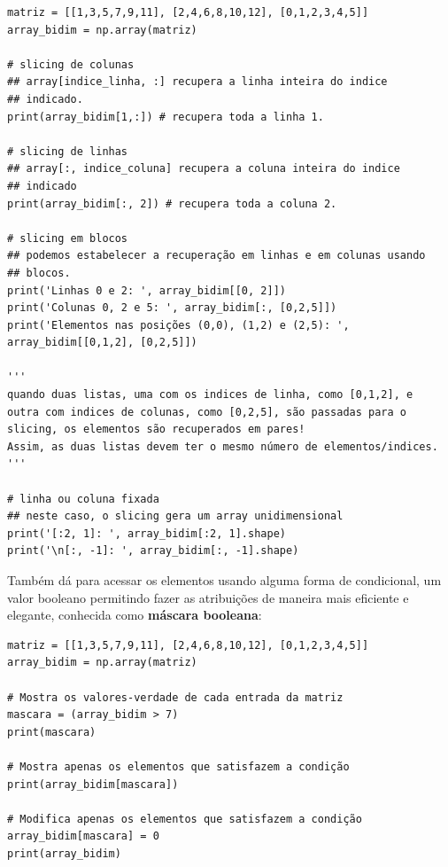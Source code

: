 \documentclass[../numerical_methods.tex]{subfiles}
\begin{document}
\begin{listing}[H]
	\begin{verbatim}
matriz = [[1,3,5,7,9,11], [2,4,6,8,10,12], [0,1,2,3,4,5]] 
array_bidim = np.array(matriz)

# slicing de colunas 
## array[indice_linha, :] recupera a linha inteira do indice 
## indicado. 
print(array_bidim[1,:]) # recupera toda a linha 1.

# slicing de linhas 
## array[:, indice_coluna] recupera a coluna inteira do indice 
## indicado 
print(array_bidim[:, 2]) # recupera toda a coluna 2. 

# slicing em blocos 
## podemos estabelecer a recuperação em linhas e em colunas usando 
## blocos. 
print('Linhas 0 e 2: ', array_bidim[[0, 2]])
print('Colunas 0, 2 e 5: ', array_bidim[:, [0,2,5]])
print('Elementos nas posições (0,0), (1,2) e (2,5): ',
array_bidim[[0,1,2], [0,2,5]])

''' 
quando duas listas, uma com os indices de linha, como [0,1,2], e 
outra com indices de colunas, como [0,2,5], são passadas para o 
slicing, os elementos são recuperados em pares! 
Assim, as duas listas devem ter o mesmo número de elementos/indices.
'''

# linha ou coluna fixada 
## neste caso, o slicing gera um array unidimensional 
print('[:2, 1]: ', array_bidim[:2, 1].shape)
print('\n[:, -1]: ', array_bidim[:, -1].shape)
\end{verbatim}

\end{listing}

Também dá para acessar os elementos usando alguma forma de condicional, um valor booleano permitindo fazer as atribuições de maneira mais eficiente e elegante, conhecida como \textbf{máscara booleana}:
\begin{verbatim}
matriz = [[1,3,5,7,9,11], [2,4,6,8,10,12], [0,1,2,3,4,5]] 
array_bidim = np.array(matriz)

# Mostra os valores-verdade de cada entrada da matriz
mascara = (array_bidim > 7)
print(mascara)

# Mostra apenas os elementos que satisfazem a condição
print(array_bidim[mascara])

# Modifica apenas os elementos que satisfazem a condição
array_bidim[mascara] = 0 
print(array_bidim)
\end{verbatim}
\end{document}
